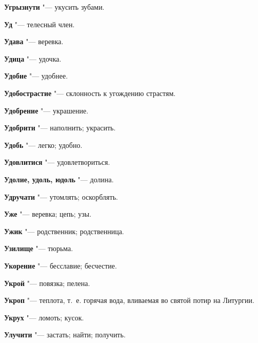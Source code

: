 \begin{mymulticols}{2}
\noindent\textbf{Угрызнути} "--- укусить зубами. 




\noindent\textbf{Уд} "--- телесный член. 




\noindent\textbf{Удава} "--- веревка. 




\noindent\textbf{Удица} "--- удочка. 




\noindent\textbf{Удобие} "--- удобнее. 




\noindent\textbf{Удобострастие} "--- склонность к угождению страстям. 




\noindent\textbf{Удобрение} "--- украшение. 




\noindent\textbf{Удобрити} "--- наполнить; украсить. 




\noindent\textbf{Удобь} "--- легко; удобно. 




\noindent\textbf{Удовлитися} "--- удовлетвориться. 




\noindent\textbf{Удолие, удоль, юдоль} "--- долина. 




\noindent\textbf{Удручати} "--- утомлять; оскорблять. 




\noindent\textbf{Уже} "--- веревка; цепь; узы. 




\noindent\textbf{Ужик} "--- родственник; родственница. 




\noindent\textbf{Узилище} "--- тюрьма. 




\noindent\textbf{Укорение} "--- бесславие; бесчестие. 




\noindent\textbf{Укрой} "--- повязка; пелена. 




\noindent\textbf{Укроп} "--- теплота, т.~е. горячая вода, вливаемая во святой потир на Литургии. 




\noindent\textbf{Укрух} "--- ломоть; кусок. 




\noindent\textbf{Улучити} "--- застать; найти; получить. 





\end{mymulticols}
